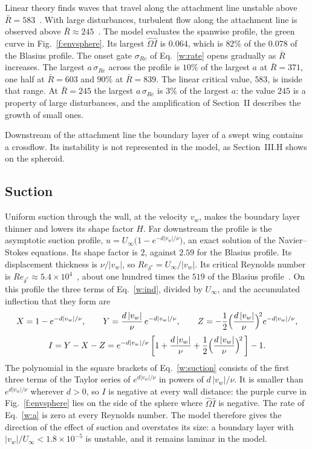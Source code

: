 \documentclass[conf]{new-aiaa}
\begin{document}
Linear theory finds waves that travel along the attachment line unstable
above $\bar R=583$~\cite{hall_malik_poll_1984}. With large disturbances,
turbulent flow along the attachment line is observed above
$\bar R\approx245$~\cite{poll_1979}. The model evaluates the spanwise
profile, the green curve in Fig.~\ref{f:envsphere}. Its largest
$\hat\Omega\hat I$ is $0.064$, which is $82\%$ of the $0.078$ of the Blasius
profile. The onset gate $\sigma_{Re}$ of Eq.~\eqref{w:rate} opens
gradually as $\bar R$ increases. The largest $a\,\sigma_{Re}$ across the
profile is $10\%$ of the largest $a$ at $\bar R=371$, one half at
$\bar R=603$ and $90\%$ at $\bar R=839$. The linear critical value, $583$, is
inside that range. At $\bar R=245$ the largest $a\,\sigma_{Re}$ is $3\%$ of
the largest $a$: the value $245$ is a property of large disturbances, and the
amplification of Section~II describes the growth of small ones.

Downstream of the attachment line the boundary layer of a swept wing contains
a crossflow. Its instability is not represented in the model, as
Section~III.H shows on the spheroid.

\subsection{Suction}

Uniform suction through the wall, at the velocity $v_w$, makes the boundary
layer thinner and lowers its shape factor $H$. Far downstream the profile is
the asymptotic suction profile, $u=U_\infty\big(1-e^{-d|v_w|/\nu}\big)$, an
exact solution of the Navier--Stokes equations. Its
shape factor is $2$, against $2.59$ for the Blasius profile. Its
displacement thickness is $\nu/|v_w|$, so $Re_{\delta^*}=U_\infty/|v_w|$. Its
critical Reynolds number is
$Re_{\delta^*}\approx5.4\times10^4$~\cite{hocking_1975}, about one hundred
times the $519$ of the Blasius profile~\cite{schmid_henningson_2001}. On this
profile the three terms of Eq.~\eqref{w:ind}, divided by $U_\infty$, and the
accumulated inflection that they form are
\begin{gather}
  X=1-e^{-d|v_w|/\nu}, \qquad
  Y=\frac{d\,|v_w|}{\nu}\,e^{-d|v_w|/\nu}, \qquad
  Z=-\frac12\Big(\frac{d\,|v_w|}{\nu}\Big)^{\!2}e^{-d|v_w|/\nu}, \notag\\[3pt]
  I = Y-X-Z = e^{-d|v_w|/\nu}\,\bigg[1+\frac{d\,|v_w|}{\nu}
      +\frac12\Big(\frac{d\,|v_w|}{\nu}\Big)^{\!2}\,\bigg]-1 .
  \label{w:suction}
\end{gather}
The polynomial in the square brackets of Eq.~\eqref{w:suction} consists of the
first three terms of the Taylor series of $e^{d|v_w|/\nu}$ in powers of
$d\,|v_w|/\nu$. It is smaller than $e^{d|v_w|/\nu}$ wherever $d>0$, so $I$ is
negative at every wall distance: the purple curve in
Fig.~\ref{f:envsphere} lies on the side of the sphere where
$\hat\Omega\hat I$ is negative. The rate of Eq.~\eqref{w:a} is zero at every
Reynolds number. The model therefore gives the direction of the effect of
suction and overstates its size: a boundary layer with
$|v_w|/U_\infty<1.8\times10^{-5}$ is unstable, and it remains laminar in the
model.
\end{document}
